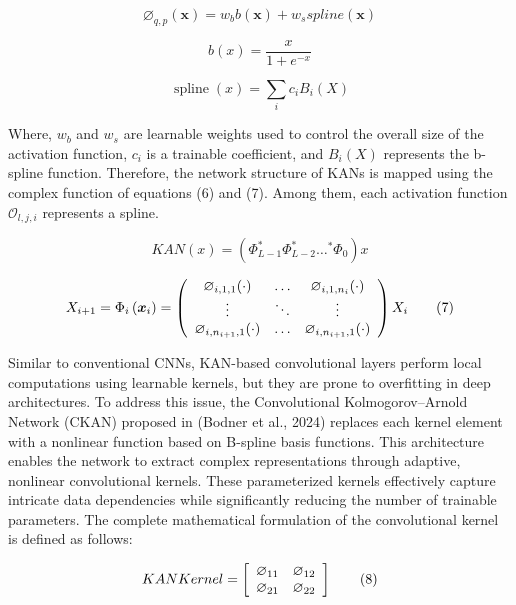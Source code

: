 \documentclass[
  10
]{article}
\begin{document}
\[
\varnothing_ {q, p} (\boldsymbol {x}) = w _ {b} b (\boldsymbol {x}) + w _ {s} s p l i n e (\boldsymbol {x}) \tag {3}
\]

\[
b (x) = \frac {x}{1 + e ^ {- x}} \tag {4}
\]

\[
\operatorname {s p l i n e} (x) = \sum_ {i} c _ {i} B _ {i} (X) \tag {5}
\]

Where, \(w _ { b }\) and \(w _ { s }\) are learnable weights used to
control the overall size of the activation function, \(c _ { i }\) is a
trainable coefficient, and \(B _ { i } ( X )\) represents the b-spline
function. Therefore, the network structure of KANs is mapped using the
complex function of equations (6) and (7). Among them, each activation
function \(\mathcal { O } _ { l , j , i }\) represents a spline.

\[
K A N (x) = \left(\Phi_ {L - 1} ^ {*} \Phi_ {L - 2} ^ {*} \dots^ {*} \Phi_ {0}\right) x \tag {6}
\]

\[
X _ {i + 1} = \Phi_ {i} \left(\boldsymbol {x} _ {i}\right) = \left( \begin{array}{c c c} \varnothing_ {i, 1, 1} (\cdot) & \dots & \varnothing_ {i, 1, n _ {i}} (\cdot) \\ \vdots & \ddots & \vdots \\ \varnothing_ {i, n _ {i + 1}, 1} (\cdot) & \dots & \varnothing_ {i, n _ {i + 1}, 1} (\cdot) \end{array} \right) X _ {i} \tag {7}
\]

Similar to conventional CNNs, KAN-based convolutional layers perform
local computations using learnable kernels, but they are prone to
overfitting in deep architectures. To address this issue, the
Convolutional Kolmogorov--Arnold Network (CKAN) proposed in (Bodner et
al., 2024) replaces each kernel element with a nonlinear function based
on B-spline basis functions. This architecture enables the network to
extract complex representations through adaptive, nonlinear
convolutional kernels. These parameterized kernels effectively capture
intricate data dependencies while significantly reducing the number of
trainable parameters. The complete mathematical formulation of the
convolutional kernel is defined as follows:

\[
K A N K e r n e l = \left[ \begin{array}{l l} \varnothing_ {1 1} & \varnothing_ {1 2} \\ \varnothing_ {2 1} & \varnothing_ {2 2} \end{array} \right] \tag {8}
\]
\end{document}
